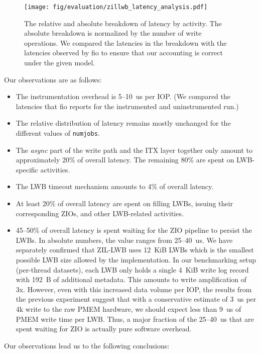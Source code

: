 \documentclass[12pt,a4paper,twoside]{book}
\begin{document}
\begin{figure}[H]
    \centering
    \texttt{[image: fig/evaluation/zillwb\_latency\_analysis.pdf]}
    \caption{The relative and absolute breakdown of latency by activity.
    The absolute breakdown is normalized by the number of write operations.
    We compared the latencies in the breakdown with the latencies observed by fio to ensure that our accounting is correct under the given model.
    }
    \label{fig:lwbanalysis:breakdown_charts}
\end{figure}

Our observations are as follows:
\begin{itemize}[noitemsep]
    \item The instrumentation overhead is 5--10~us per IOP. (We compared the latencies that fio reports for the instrumented and uninstrumented run.)
    \item The relative distribution of latency remains mostly unchanged for the different values of \lstinline{numjobs}.
    \item The \textit{async} part of the write path and the ITX layer together only amount to approximately 20\% of overall latency.
        The remaining 80\% are spent on LWB-specific activities.
    \item The LWB timeout mechanism amounts to 4\% of overall latency.
    \item At least 20\% of overall latency are spent on filling LWBs, issuing their corresponding ZIOs, and other LWB-related activities.
    \item 45--50\% of overall latency is spent waiting for the ZIO pipeline to persist the LWBs.
        In absolute numbers, the value ranges from 25--40~us.
        We have separately confirmed that ZIL-LWB uses 12~KiB LWBs which is the smallest possible LWB size allowed by the implementation.
        In our benchmarking setup (per-thread datasets), each LWB only holds a single 4~KiB write log record with 192~B of additional metadata.
        This amounts to write amplification of 3x.
        However, even with this increased data volume per IOP, the results from the previous experiment suggest that with a conservative estimate of 3~us per 4k write to the raw PMEM hardware, we should expect less than 9~us of PMEM write time per LWB.
        Thus, a major fraction of the 25--40~us that are spent waiting for ZIO is actually pure software overhead.
\end{itemize}

Our observations lead us to the following conclusions:
\end{document}
